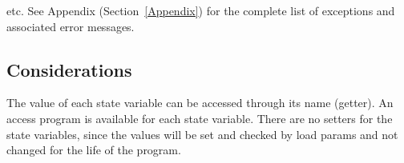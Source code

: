 \documentclass[12pt, titlepage]{article}
\begin{document}
\begin{longtable*}[l]{l l}
\end{longtable*}

etc.  See Appendix (Section~\ref{Appendix}) for the complete list of exceptions and
associated error messages.

\subsection{Considerations}

The value of each state variable can be accessed through its name (getter).  An
access program is available for each state variable.  There are no setters for
the state variables, since the values will be set and checked by load params and
not changed for the life of the program.

\newpage




\end{document}
